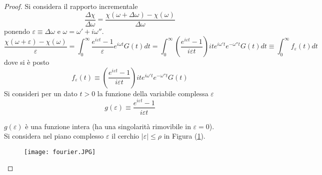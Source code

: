 \documentclass[twoside]{article}
\begin{document}
\begin{proof}
Si considera il rapporto incrementale
\begin{equation}
    \frac{\Delta \chi}{\Delta \omega}=\frac{\chi(\omega + \Delta \omega)-\chi(\omega)}{\Delta \omega}
\end{equation}
ponendo $\varepsilon\equiv \Delta \omega$ e $\omega=\omega' + i \omega''$.
\begin{equation}
    \frac{\chi(\omega+\varepsilon)-\chi(\omega)}{\varepsilon}=\int_0^\infty\frac{e^{i\varepsilon t}-1}{\varepsilon}e^{i\omega t}G(t)dt=\int_0^\infty\left( \frac{e^{i\varepsilon t}-1}{i\varepsilon t} \right)ite^{i\omega' t}e^{-\omega'' t}G(t)dt \equiv \int_0^\infty f_\varepsilon(t)dt
\end{equation}
dove si è posto
\begin{equation}
    f_\varepsilon(t)\equiv \left( \frac{e^{i\varepsilon t}-1}{i\varepsilon t} \right)ite^{i\omega' t}e^{-\omega'' t}G(t)
\end{equation}
Si consideri per un dato $t>0$ la funzione della variabile complessa $\varepsilon$
\begin{equation}
    g(\varepsilon)\equiv \frac{e^{i\varepsilon t}-1}{i\varepsilon t}
\end{equation}

$g(\varepsilon)$ è una funzione intera (ha una singolarità rimovibile in $\varepsilon=0$).
\\
Si considera nel piano complesso $\varepsilon$ il cerchio $|\varepsilon|\le \rho$ in Figura (\ref{cerc}).
\begin{figure}[H]
\centering
\texttt{[image: fourier.JPG]}
\label{cerc}
\end{figure}


\end{proof}
\end{document}
